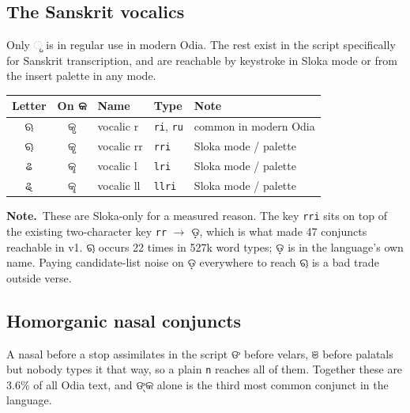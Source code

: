 \documentclass[11pt, a4paper]{article}
\newcommand{\od}[1]{{\odiafont #1}}          %
\newcommand{\odb}[1]{{\odiafont\large #1}}   %
\newcommand{\knote}{{\color{headerblue}\textbf{\textsf{Note.}}}\ }
\begin{document}
\subsection*{The Sanskrit vocalics}

Only \od{ୃ} is in regular use in modern Odia. The rest exist in the script specifically
for Sanskrit transcription, and are reachable by keystroke in Sloka mode or from the
insert palette in any mode.

\begin{center}
\begin{tabular}{c c l l l}
\toprule
Letter & On \od{କ} & Name & Type & Note \\
\midrule
\odb{ଋ} & \odb{କୃ} & vocalic r  & \texttt{ri}, \texttt{ru}  & common in modern Odia \\
\odb{ୠ} & \odb{କୄ} & vocalic rr & \texttt{rri}              & Sloka mode / palette \\
\odb{ଌ} & \odb{କୢ} & vocalic l  & \texttt{lri}              & Sloka mode / palette \\
\odb{ୡ} & \odb{କୣ} & vocalic ll & \texttt{llri}             & Sloka mode / palette \\
\bottomrule
\end{tabular}
\end{center}

\begin{notebox}
\knote These are Sloka-only for a measured reason. The key \texttt{rri} sits on top of
the existing two-character key \texttt{rr} $\rightarrow$ \od{ଡ଼}, which is what made 47
conjuncts reachable in v1. \od{ୠ} occurs 22 times in 527k word types; \od{ଡ଼} is in the
language's own name. Paying candidate-list noise on \od{ଡ଼} everywhere to reach \od{ୠ} is
a bad trade outside verse.
\end{notebox}

\subsection*{Homorganic nasal conjuncts}

A nasal before a stop assimilates in the script \textemdash{} \od{ଙ} before velars,
\od{ଞ} before palatals \textemdash{} but nobody types it that way, so a plain
\texttt{n} reaches all of them.
Together these are 3.6\% of all Odia text, and \od{ଙ୍କ} alone is the third most common
conjunct in the language.
\end{document}
